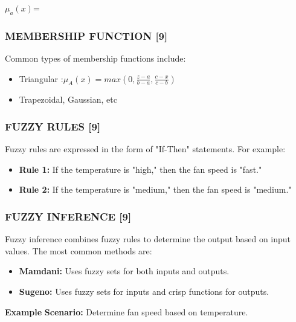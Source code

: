 \documentclass[12pt,a4paper]{article}
\begin{document}
\begin{center}  
   $ \mu_{a}(x)$=
\end{center}

\subsubsection*{MEMBERSHIP FUNCTION [9] }
\hspace{1em}Common types of membership functions include:

\begin{itemize}
    \item Triangular :$\mu_{A}(x)=max(0,\frac{z-a}{b-a},\frac{c-x}{c-b})$

    \item Trapezoidal, Gaussian, etc
\end{itemize}

\subsubsection*{FUZZY RULES [9]}
\hspace{1em} Fuzzy rules are expressed in the form of "If-Then" statements. For example:

\begin{itemize}
    \item \textbf{Rule 1:} If the temperature is "high," then the fan speed is "fast."

    \item \textbf{Rule 2:} If the temperature is "medium," then the fan speed is "medium."
\end{itemize}

\subsubsection*{FUZZY INFERENCE [9]}
\hspace{1em}Fuzzy inference combines fuzzy rules to determine the output based on input values. The most common methods are:
\begin{itemize}
    \item 	\textbf{Mamdani:} Uses fuzzy sets for both inputs and outputs.

    \item \textbf{Sugeno:} Uses fuzzy sets for inputs and crisp functions for outputs.
\end{itemize}


\textbf{Example}
\textbf{Scenario:} Determine fan speed based on temperature.
\end{document}
